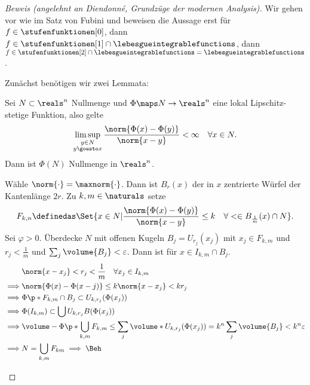 \begin{proof}[Beweis (angelehnt an Diendonné, Grundzüge der modernen Analysis)]
  Wir gehen vor wie im Satz von Fubini und beweisen die Aussage erst für \( f\in \stufenfunktionen[0] \), dann \( f\in \stufenfunktionen[1]\cap \lebesgueintegrablefunctions \), dann \( f\in \stufenfunktionen[2]\cap \lebesgueintegrablefunctions=\lebesgueintegrablefunctions \).
  
  Zunächst benötigen wir zwei Lemmata:
  \begin{lemma}\label{lipschitz_stetige_funktion_bild_von_nullmenge_ist_nullmenge}
    Sei \( N\subset \reals^n \) Nullmenge und \( \Phi\maps N\to \reals^n \) eine lokal Lipschitz-stetige Funktion, also gelte
    \begin{equation*}
      \limsup_{\substack{y\in N\\ y\goesto x}}\frac{\norm{\Phi(x)-\Phi(y)}}{\norm{x-y}}<\infty\quad \forall x\in N.
    \end{equation*}
    Dann ist \( \Phi(N) \) Nullmenge in \( \reals^n \).
  \end{lemma}
  \begin{subproof}
    Wähle \( \norm{\cdot}=\maxnorm{\cdot} \). Dann ist \( B_r(x) \) der in \( x \) zentrierte Würfel der Kantenlänge \( 2r \). Zu \( k, m\in \naturals \) setze
    \begin{equation*}
      F_{k,n}\definedas \Set{x\in N|\frac{\norm{\Phi(x)-\Phi(y)}}{\norm{x-y}}\leq k\quad \forall <\in B_{\frac{1}{m}}(x)\cap N}.
    \end{equation*}
    Sei \( \varphi>0 \). Überdecke \( N \) mit offenen Kugeln \( B_j=U_{r_j}(x_j) \) mit \( x_j\in F_{k,m} \) und \( r_j<\frac{1}{m} \) und \( \sum_{j}\volume{B_j}<\varepsilon \). Dann ist für \( x\in I_{k,m}\cap B_j \).
    \begin{align*}
      &\norm{x-x_j}<r_j<\frac{1}{m}\quad \forall x_j\in I_{k,m}\\
      \implies &\norm{\Phi(x)-\Phi(x-j)}\leq k\norm{x-x_j}<k r_j\\
      \implies &\Phi\p*{F_{k,m}\cap B_j}\subset U_{k,r_j}(\Phi(x_j))\\
      \implies &\Phi(I_{k,m})\subset \bigcup U_{k,r_j} B(\Phi(x_j))\\
      \implies &\volume-{\Phi\p*{\bigcup_{k,m}F_{k,m}}}\leq \sum_{j}\volume*{U_{k,r_j}(\Phi(x_j))}=k^n \sum_{j}\volume{B_j}<k^n \varepsilon\\
      \implies &N=\bigcup_{k,m}F_{km}\implies \text{\Beh}
    \end{align*}
    

\end{subproof}
\end{proof}
